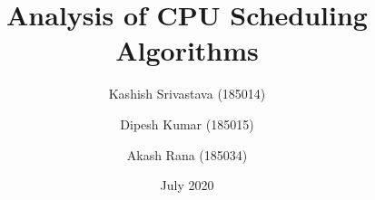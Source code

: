 \documentclass[11pt,a4paper]{report}
\begin{document}
\title{Analysis of CPU Scheduling Algorithms}


\author{Kashish Srivastava (185014)\\
        \and 
        Dipesh Kumar (185015)\\
        \and
        Akash Rana (185034)
}

\titleformat{\chapter}{\bfseries\huge\centering}{}{0pt}{}{\huge}
\titlespacing*{\chapter}{0pt}{-60pt}{20pt}
\setlength{\parindent}{2em}
\setlength{\parskip}{1em}

\newenvironment{myindentpar}[1]%
  {\begin{list}{}%
          {\setlength{\leftmargin}{#1}}%
          \item[]%
  }
  {\end{list}}
\date{July 2020}

\pagestyle{plain}
\end{document}
